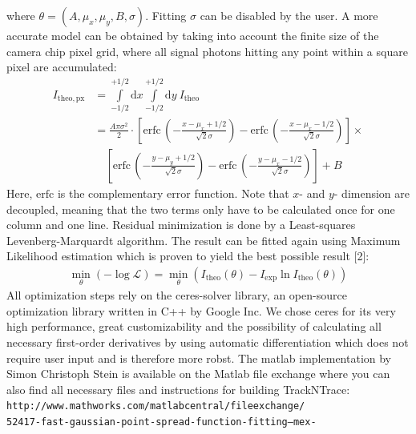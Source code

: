 \documentclass[11pt,onside]{report}
\newcommand{\D}[0]{\text{d}}
\numberwithin{equation}{chapter}
\begin{document}
where $\theta = (A,\mu_x,\mu_y,B,\sigma)$. Fitting $\sigma$ can be disabled by the user. A more accurate model can be obtained by taking into account the finite size of the camera chip pixel grid, where all signal photons hitting any point within a square pixel are accumulated:
\begin{align*}
I_\mathrm{theo, px} &= \int\limits^{+1\slash 2}_{-1\slash 2} \D x \int\limits^{+1\slash 2}_{-1\slash 2} \D y\: I_\mathrm{theo} \\
&= \frac{A \pi \sigma^2}{2}\cdot \left[\mathrm{erfc}\,\left(-\frac{x-\mu_x+1\slash 2}{\sqrt{2} \sigma}\right) - \mathrm{erfc}\,\left(-\frac{x-\mu_x-1\slash 2}{\sqrt{2} \sigma}\right)\right] \times \\
&\quad \left[\mathrm{erfc}\,\left(-\frac{y-\mu_y+1\slash 2}{\sqrt{2} \sigma}\right) - \mathrm{erfc}\,\left(-\frac{y-\mu_x-1\slash 2}{\sqrt{2} \sigma}\right)\right] +B
\end{align*}
Here, $\mathrm{erfc}$ is the complementary error function. Note that $x$- and $y$- dimension are decoupled, meaning that the two terms only have to be calculated once for one column and one line. Residual minimization is done by a Least-squares Levenberg-Marquardt algorithm. The result can be fitted again using Maximum Likelihood estimation which is proven to yield the best possible result [2]:
\begin{align*}
\min_\theta (-\log\mathcal{L}) = \min_\theta (I_\mathrm{theo}(\theta) - I_\mathrm{exp} \ln I_\mathrm{theo}(\theta))
\end{align*}
All optimization steps rely on the ceres-solver library, an open-source optimization library written in C++ by Google Inc. We chose ceres for its very high performance, great customizability and the possibility of calculating all necessary first-order derivatives by using automatic differentiation which does not require user input and is therefore more robst. The matlab implementation by Simon Christoph Stein is available on the Matlab file exchange where you can also find all necessary files and instructions for building TrackNTrace:  \texttt{http://www.mathworks.com/matlabcentral/fileexchange/\\52417-fast-gaussian-point-spread-function-fitting--mex-}\\[10pt]
\end{document}
